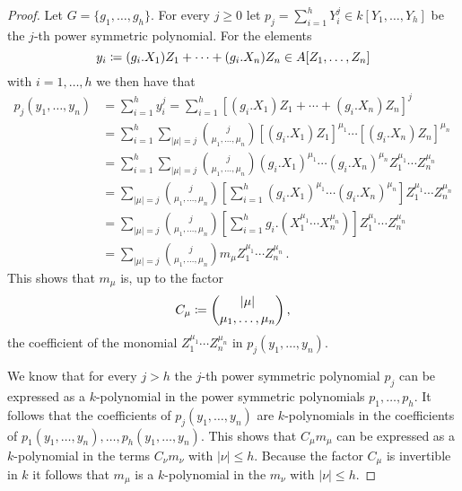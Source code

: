 \begin{proof}
  Let $G = \{g_1, \dotsc, g_h\}$.
  For every $j \geq 0$ let $p_j = \sum_{i=1}^h Y_i^j \in k[Y_1, \dotsc, Y_h]$ be the $j$-th power symmetric polynomial.
  For the elements
  \[
              y_i
    \coloneqq  (g_i.X_1) Z_1 + \dotsb + (g_i.X_n) Z_n
    \in       A[Z_1, \dotsc, Z_n]
  \]
  with $i = 1, \dotsc, h$ we then have that
  \begingroup
  \allowdisplaybreaks
  \begin{align*}
        p_j(y_1, \dotsc, y_n)
    &=  \sum_{i=1}^h y_i^j
     =  \sum_{i=1}^h \left[ (g_i.X_1) Z_1 + \dotsb + (g_i.X_n) Z_n \right]^j  \\
    &=  \sum_{i=1}^h \sum_{|\mu| = j}
        \binom{j}{\mu_1, \dotsc, \mu_n} [(g_i.X_1) Z_1]^{\mu_1} \dotsm [(g_i.X_n) Z_n]^{\mu_n}  \\
    &=  \sum_{i=1}^h \sum_{|\mu| = j}
        \binom{j}{\mu_1, \dotsc, \mu_n} (g_i.X_1)^{\mu_1} \dotsm (g_i.X_n)^{\mu_n} Z_1^{\mu_1} \dotsm Z_n^{\mu_n} \\
    &=  \sum_{|\mu| = j} \binom{j}{\mu_1, \dotsc, \mu_n}
        \left[
          \sum_{i=1}^h (g_i.X_1)^{\mu_1} \dotsm (g_i.X_n)^{\mu_n}
        \right]
        Z_1^{\mu_1} \dotsm Z_n^{\mu_n}  \\
    &=  \sum_{|\mu| = j} \binom{j}{\mu_1, \dotsc, \mu_n}
        \left[
          \sum_{i=1}^h g_i.(X_1^{\mu_1} \dotsm X_n^{\mu_n})
        \right]
        Z_1^{\mu_1} \dotsm Z_n^{\mu_n}  \\
    &=  \sum_{|\mu| = j} \binom{j}{\mu_1, \dotsc, \mu_n} m_\mu Z_1^{\mu_1} \dotsm Z_n^{\mu_n} \,.
  \end{align*}
  \endgroup
  This shows that $m_\mu$ is, up to the factor
  \[
              C_\mu
    \coloneqq  \binom{|\mu|}{\mu_1, \dotsc, \mu_n} \,,
  \]
  the coefficient of the monomial $Z_1^{\mu_1} \dotsm Z_n^{\mu_n}$ in $p_j(y_1, \dotsc, y_n)$.
  
  We know that for every $j > h$ the $j$-th power symmetric polynomial $p_j$ can be expressed as a $k$-polynomial in the power symmetric polynomials $p_1, \dotsc, p_h$.
  It follows that the coefficients of $p_j(y_1, \dotsc, y_n)$ are $k$-polynomials in the coefficients of $p_1(y_1, \dotsc, y_n), \dotsc, p_h(y_1, \dotsc, y_n)$.
  This shows that $C_\mu m_\mu$ can be expressed as a $k$-polynomial in the terms $C_\nu m_\nu$ with $|\nu| \leq h$.
  Because the factor $C_\mu$ is invertible in $k$ it follows that $m_\mu$ is a $k$-polynomial in the $m_\nu$ with $|\nu| \leq h$.
\end{proof}


